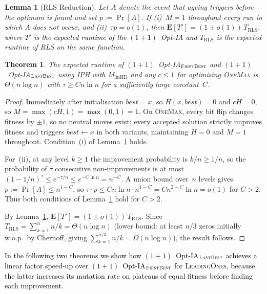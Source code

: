 \documentclass[lettersize,journal]{IEEEtran}
\newcommand{\new}[1]{\textcolor{black}{#1}}
\newcommand{\rerev}[1]{\textcolor{black}{#1}}
\newcommand{\oneoneOPTIA}{$(1+1)$~Opt-IA}
\newcommand{\linHD}{M$_{\text{linHD}}$}
\newcommand{\IPHfcm}{IPH}
\newcommand{\firstBest}{$(1+1)$~Opt-IA$_{\textsc{FirstBest}}$}
\newcommand{\lastBest}{$(1+1)$~Opt-IA$_{\textsc{LastBest}}$}
\newtheorem{theorem}{Theorem}
\newtheorem{lemma}{Lemma}
\begin{document}
\begin{lemma}[RLS Reduction]\label{lem:RLS-reduction}
Let $A$ denote the event that ageing triggers before the optimum is found
and set $p:=\Pr[A]$.
If \emph{(i)}~$M=1$ throughout every run in which $A$ does not occur, and
\emph{(ii)}~$\tau p=o(1)$,
then $\mathbf{E}[T']=(1\pm o(1))\,T_{\mathrm{RLS}}$,
where \rerev{$T'$ is the expected runtime of the \oneoneOPTIA{} and} $T_{\mathrm{RLS}}$ is the expected runtime of RLS
 on the same function.
\end{lemma}



\begin{theorem}\label{thm:onemaxexpo}
The expected runtime of \firstBest{} and \lastBest{} using \IPHfcm{} with
\linHD{} and any $c\leq 1$ for optimising \textsc{OneMax} is $\Theta(n\log n)$
with $\tau\geq Cn\ln n$ for a sufficiently large constant~$C$.
\end{theorem}
\begin{proof}
Immediately after initialisation $\mathit{best}=x$, so $H(x,\mathit{best})=0$
and \rerev{$cH=0$, so $M=\max(cH,1)=\max(0,1)=1$}.
On \textsc{OneMax}, every bit flip changes fitness by $\pm 1$, so no neutral
moves exist; every accepted solution strictly improves fitness and triggers
$\mathit{best}\leftarrow x$ in both variants, maintaining $H=0$ and $M=1$
throughout.  Condition~(i) of Lemma~\ref{lem:RLS-reduction} holds.

For~(ii), at any level $k\geq 1$ the improvement probability is $k/n\geq 1/n$,
so the probability of $\tau$ consecutive non-improvements is at most
$(1-1/n)^\tau\leq e^{-\tau/n}\leq e^{-C\ln n}=n^{-C}$.
A union bound over~$n$ levels gives $p:=\Pr[A]\leq n^{1-C}$\rerev{, so}
$\tau\cdot p\leq Cn\ln n\cdot n^{1-C}=Cn^{2-C}\ln n=o(1)$ for $C>2$.
Thus both conditions of Lemma~\ref{lem:RLS-reduction} hold for $C>2$.

By Lemma~\ref{lem:RLS-reduction},
$\mathbf{E}[T']=(1\pm o(1))\,T_{\mathrm{RLS}}$.
Since $T_{\mathrm{RLS}}=\sum_{k=1}^{n}n/k=\Theta(n\log n)$ (lower bound: at
least $n/3$ zeros initially w.o.p.\ by Chernoff, giving
$\sum_{k=1}^{n/3}n/k=\Omega(n\log n)$), the result follows.
\end{proof}



\new{In the following two theorems we show how \lastBest{} achieves a linear
factor speed-up over \firstBest{} for \textsc{LeadingOnes}, because the latter
increases its mutation rate on plateaus of equal fitness before finding each
improvement.}
\end{document}
